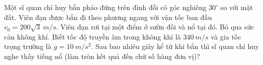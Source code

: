 \begin{ex}
Một sĩ quan chỉ huy bắn pháo đứng trên đỉnh đồi có góc nghiêng $30^\circ$ so với mặt đất. Viên đạn được bắn đi theo phương ngang với vận tốc ban đầu $v_0 = 200\sqrt{3}\ m/s$. Viên đạn rơi tại một điểm ở sườn đồi và nổ tại đó. Bỏ qua sức cản không khí. Biết tốc độ truyền âm trong không khí là $340\ m/s$ và gia tốc trọng trường là $g = 10\ m/s^2$. Sau bao nhiêu giây kể từ khi bắn thì sĩ quan chỉ huy nghe thấy tiếng nổ (làm tròn kết quả đến chữ số hàng đơn vị)?
\end{ex}






